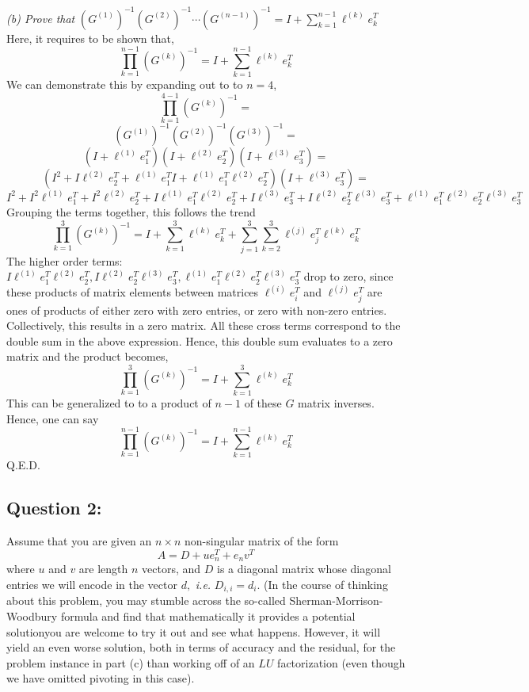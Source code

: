 \documentclass{article}
\begin{document}
\emph{ (b) 
 Prove that} $\displaystyle \left(G^{(1)}\right)^{-1}\left(G^{(2)}\right)^{-1}\cdots\left(G^{(n-1)}\right)^{-1} = I + \sum_{k=1}^{n-1} \ell^{(k)}e_k^T$
\newline 
Here, it requires to be shown that, 
$$ 
\prod_{k=1}^{n-1}   \left(G^{(k)}\right)^{-1} =  I + \sum_{k=1}^{n-1} \ell^{(k)}e_k^T     
$$ 
We can demonstrate this by expanding out to to $n=4$, 
$$ \prod_{k=1}^{4-1}     \left(G^{(k)}\right)^{-1} =   $$ 
$$ \left(G^{(1)}\right)^{-1}   \left(G^{(2)}\right)^{-1}   \left(G^{(3)}\right)^{-1} = $$ 
$$  (I + \ell^{(1)}e_1^T ) (I + \ell^{(2)}e_2^T ) (I + \ell^{(3)}e_3^T )  =$$ 
$$ (I^{2} + I \ell^{(2)}e_2^T  + \ell^{(1)}e_1^T I + \ell^{(1)}e_1^T  \ell^{(2)}e_2^T)( I + \ell^{(3)}e_3^T ) =$$ 
$$  I^{2} +  I^{2} \ell^{(1)}e_1^T+  I^{2} \ell^{(2)}e_2^T +  I \ell^{(1)}e_1^T \ell^{(2)}e_2^T +  I \ell^{(3)}e_3^T  +    I \ell^{(2)}e_2^T \ell^{(3)}e_3^T +      \ell^{(1)}e_1^T \ell^{(2)}e_2^T \ell^{(3)}e_3^T
$$ 
Grouping the terms together, this follows the trend 
$$  \prod_{k=1}^{3}  \left(G^{(k)}\right)^{-1} = I + \sum_{k=1}^{3} \ell^{(k)}e_k^T + \sum_{j=1}^{3}\sum_{k=2}^{3} \ell^{(j)}e_j^T \ell^{(k)}e_k^T $$ 
The higher order terms: $ I \ell^{(1)}e_1^T \ell^{(2)}e_2^T,  I \ell^{(2)}e_2^T \ell^{(3)}e_3^T ,  \ell^{(1)}e_1^T \ell^{(2)}e_2^T \ell^{(3)}e_3^T$ drop to zero, since these products of matrix elements between matrices $\ell^{(i)}e_i^T$ and  $\ell^{(j)}e_j^T$ are ones of products of either zero with zero entries, or zero with non-zero entries. Collectively, this results in a zero matrix. All these cross terms correspond to the double sum  in the above expression. Hence, this double sum evaluates to a zero matrix and the product becomes, 
$$  \prod_{k=1}^{3}  \left(G^{(k)}\right)^{-1} = I + \sum_{k=1}^{3} \ell^{(k)}e_k^T $$ 
\newline 
This can be generalized to to a product of $n-1$ of these $G$ matrix inverses. Hence, one can say 
$$ 
\prod_{k=1}^{n-1}   \left(G^{(k)}\right)^{-1} =  I + \sum_{k=1}^{n-1} \ell^{(k)}e_k^T     
$$  
Q.E.D. 
 
\subsection*{Question 2:}
Assume that you are given an $n \times n$ non-singular matrix of the form 
\[
A = D + ue_n^T + e_nv^T
\]
where $u$ and $v$ are length $n$ vectors, and $D$ is a diagonal matrix whose diagonal entries we will encode in the vector $d,$ \emph{i.e.} $D_{i,i} = d_i.$ (In the course of thinking about this problem, you may stumble across the so-called Sherman-Morrison-Woodbury formula and find that mathematically it provides a potential solution\textemdash you are welcome to try it out and see what happens. However, it will yield an even worse solution, both in terms of accuracy and the residual, for the problem instance in part (c) than working off of an $LU$ factorization (even though we have omitted pivoting in this case).
\newline
 
\end{document}
